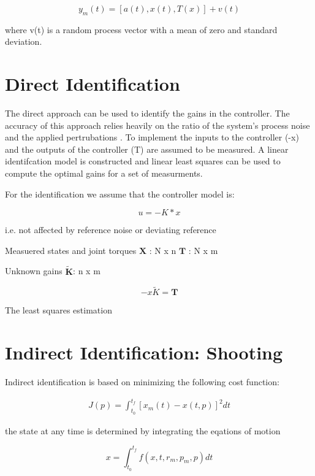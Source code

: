 \documentclass{article}
\begin{document}
\begin{equation}
  y_m(t) = [a(t), x(t), T(x)] + v(t)
\end{equation}

where v(t) is a random process vector with a mean of zero and standard
deviation.

\section{Direct Identification}

The direct approach can be used to identify the gains in the controller. The
accuracy of this approach relies heavily on the ratio of the system's process
noise and the applied pertrubations \cite{Kooij2005}. To implement the inputs
to the controller (-x) and the outputs of the controller (T) are assumed to be
measured. A linear identifcation model is constructed and linear least squares
can be used to compute the optimal gains for a set of measurments.

For the identification we assume that the controller model is:

\begin{equation}
  u = -K * x
\end{equation}

i.e. not affected by reference noise or deviating reference

Measuered states and joint torques
$\mathbf{X}$ : N x n
$\mathbf{T}$ : N x m

Unknown gains
$\tilde{\mathbf{K}}$: n x m

\begin{equation}
  -x \tilde{K} = \mathbf{T}
\end{equation}

The least squares estimation

\section{Indirect Identification: Shooting}

Indirect identification is based on minimizing the following cost function:

\begin{align}
  J(p) = \int_{t_0}^{t_f} [x_m(t) - x(t, p)]^2 dt
\end{align}

the state at any time is determined by integrating the eqations of motion

\begin{equation}
  x = \int_{t_0}^{t_f} f(x, t, r_m, p_m, p) dt
\end{equation}
\end{document}
